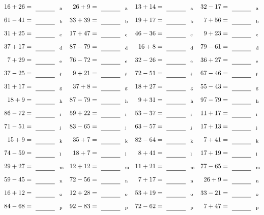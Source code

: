 \documentclass
[
  draft    = true,
  fontsize = 11pt,
  parskip  = half-
]
{scrartcl}
\begin{document}
\clearpage
\begin{align*}
    \pline{16+26}&=\rline{a}
  & \pline{26+9}&=\rline{a}
  & \pline{13+14}&=\rline{a}
  & \pline{32-17}&=\rline{a} \\[1ex]
    \pline{61-41}&=\rline{b}
  & \pline{33+39}&=\rline{b}
  & \pline{19+17}&=\rline{b}
  & \pline{7+56}&=\rline{b} \\[1ex]
    \pline{31+25}&=\rline{c}
  & \pline{17+47}&=\rline{c}
  & \pline{46-36}&=\rline{c}
  & \pline{9+23}&=\rline{c} \\[1ex]
    \pline{37+17}&=\rline{d}
  & \pline{87-79}&=\rline{d}
  & \pline{16+8}&=\rline{d}
  & \pline{79-61}&=\rline{d} \\[1ex]
    \pline{7+29}&=\rline{e}
  & \pline{76-72}&=\rline{e}
  & \pline{32-26}&=\rline{e}
  & \pline{36+27}&=\rline{e} \\[1ex]
    \pline{37-25}&=\rline{f}
  & \pline{9+21}&=\rline{f}
  & \pline{72-51}&=\rline{f}
  & \pline{67-46}&=\rline{f} \\[1ex]
    \pline{31+17}&=\rline{g}
  & \pline{37+8}&=\rline{g}
  & \pline{18+27}&=\rline{g}
  & \pline{55-43}&=\rline{g} \\[1ex]
    \pline{18+9}&=\rline{h}
  & \pline{87-79}&=\rline{h}
  & \pline{9+31}&=\rline{h}
  & \pline{97-79}&=\rline{h} \\[1ex]
    \pline{86-72}&=\rline{i}
  & \pline{59+22}&=\rline{i}
  & \pline{53-37}&=\rline{i}
  & \pline{11+17}&=\rline{i} \\[1ex]
    \pline{71-51}&=\rline{j}
  & \pline{83-65}&=\rline{j}
  & \pline{63-57}&=\rline{j}
  & \pline{17+13}&=\rline{j} \\[1ex]
    \pline{15+9}&=\rline{k}
  & \pline{35+7}&=\rline{k}
  & \pline{82-64}&=\rline{k}
  & \pline{7+41}&=\rline{k} \\[1ex]
    \pline{74-59}&=\rline{l}
  & \pline{18+7}&=\rline{l}
  & \pline{8+41}&=\rline{l}
  & \pline{17+19}&=\rline{l} \\[1ex]
    \pline{29+27}&=\rline{m}
  & \pline{12+12}&=\rline{m}
  & \pline{11+21}&=\rline{m}
  & \pline{77-65}&=\rline{m} \\[1ex]
    \pline{59-45}&=\rline{n}
  & \pline{72-56}&=\rline{n}
  & \pline{7+17}&=\rline{n}
  & \pline{26+9}&=\rline{n} \\[1ex]
    \pline{16+12}&=\rline{o}
  & \pline{12+28}&=\rline{o}
  & \pline{53+19}&=\rline{o}
  & \pline{33-21}&=\rline{o} \\[1ex]
    \pline{84-68}&=\rline{p}
  & \pline{92-83}&=\rline{p}
  & \pline{72-62}&=\rline{p}
  & \pline{7+47}&=\rline{p}
\end{align*}
\end{document}
